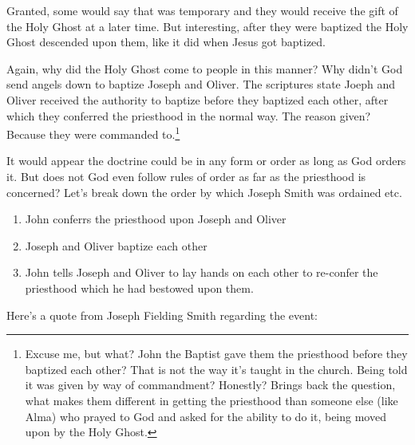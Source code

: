 Granted, some would say that was temporary and they would receive the gift of the
Holy Ghost at a later time. But interesting, after they were baptized the Holy Ghost
descended upon them, like it did when Jesus got baptized.

Again, why did the Holy Ghost come to people in this manner? Why didn't God send
angels down to baptize Joseph and Oliver. The scriptures state Joeph and Oliver
received the authority to baptize before they baptized each other, after which they
conferred the priesthood in the normal way. The reason given? Because they were
commanded to.\footnote{Excuse me, but what? John the Baptist gave them the priesthood
before they baptized each other? That is not the way it's taught in the church. Being
told it was given by way of commandment? Honestly? Brings back the question, what
makes them different in getting the priesthood than someone else (like Alma) who prayed
to God and asked for the ability to do it, being moved upon by the Holy Ghost.}

It would appear the doctrine could be in any form or order as long as God orders it.
But does not God even follow rules of order as far as the priesthood is concerned?
Let's break down the order by which Joseph Smith was ordained etc.

\begin{enumerate}
  \item John conferrs the priesthood upon Joseph and Oliver
  \item Joseph and Oliver baptize each other
  \item John tells Joseph and Oliver to lay hands on each other to re-confer the
  priesthood which he had bestowed upon them.
\end{enumerate}

Here's a quote from Joseph Fielding Smith regarding the event:

